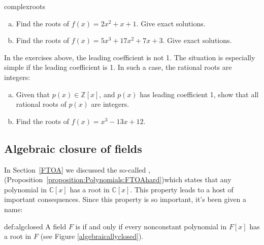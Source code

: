 \begin{exercise}{complexroots}
\begin {enumerate}[(a)]
\item
Find the roots of $f(x)=2x^2+x+1$. Give exact solutions.
\item
Find the roots of $f(x)=5x^3+17x^2+7x+3$. Give exact solutions. 
\end{enumerate}
\end{exercise}
 
In the exercises above, the leading coefficient is not 1. The situation is especially simple if the leading coefficient is 1. In such a case, the rational  roots are integers:

\begin{exercise}{}
\begin{enumerate}[(a)]
\item
Given that $p(x)  \in \mathbb{Z}[x]$, and $p(x)$ has leading coefficient 1, show that all rational roots of $p(x)$ are integers.
\item
Find the roots of $f(x)=x^3-13x+12$.
\end{enumerate}
\end{exercise}


\subsection{Algebraic closure of fields}

In Section~\ref{FTOA} we discussed the so-called , (Proposition~\ref{proposition:Polynomials:FTOAhard})which states that any polynomial in $\mathbb{C}[x]$ has a root in $\mathbb{C}[x]$. This property leads to a host of important consequences.  Since this property is so important, it's been given a name:

\begin{defn}{def:algclosed}  
A field $F$ is  if and only if every nonconstant polynomial in $F[x]$ has a root in $F$ (see Figure \ref{algebraicallyclosed}).
\end{defn}

